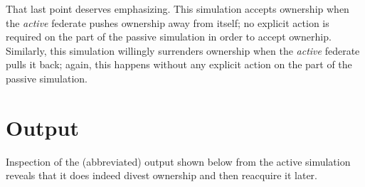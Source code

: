 That last point deserves emphasizing.
This simulation accepts ownership when the {\em active} federate pushes
ownership away from itself; no explicit action is required on the part
of the passive simulation in order to accept ownerhip.
Similarly,
this simulation willingly surrenders ownership when the {\em active}
federate pulls it back; again, this happens without any explicit action
on the part of the passive simulation.

\section{Output}

Inspection of the (abbreviated) output shown below from the active simulation
reveals that it does indeed divest ownership and then reacquire it later.

